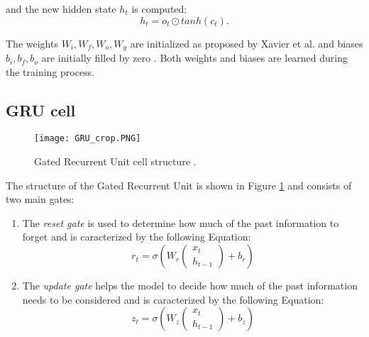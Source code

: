 and the new hidden state $h_t$ is computed:
\begin{equation}
    h_t = o_t \odot tanh(c_t) .
\end{equation}

The weights $W_i, W_f, W_o, W_g$ are initialized as proposed by Xavier et al. 
\cite{Xavier} and biases $b_i, b_f, b_o$ are initially filled by zero \cite{init}.
Both weights and biases are learned during the training process.





\subsection{GRU cell}

\begin{figure}[hb]
\centerline{\texttt{[image: GRU\_crop.PNG]}}
\caption{Gated Recurrent Unit cell structure \cite{LSTM_GRU_structure}.}
\label{fig:gru}
\end{figure}

The structure of the Gated Recurrent Unit is shown in Figure \ref{fig:gru} 
and consists of two main gates:

\begin{enumerate}
    \item The \textit{reset gate} is used to determine how much of the past 
    information to forget and is caracterized by the following Equation:
        \begin{equation}
            r_t = \sigma \left(
                W_r
                \begin{pmatrix}
                x_t \\
                h_{t-1}
                \end{pmatrix}
                + b_r
            \right)
        \end{equation}
    
    \item The \textit{update gate} helps the model to decide how much of the past 
    information needs to be considered and is caracterized by the following Equation:
        \begin{equation}
            z_t = \sigma \left(
                W_z
                \begin{pmatrix}
                x_t \\
                h_{t-1}
                \end{pmatrix}
                + b_z
            \right)
        \end{equation}

\end{enumerate}

